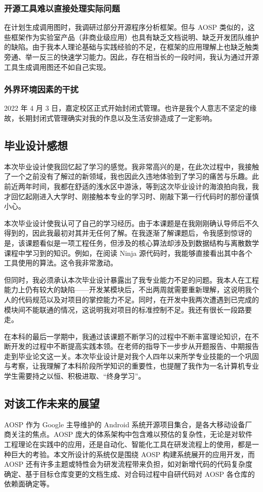 \subsubsection{开源工具难以直接处理实际问题}

在计划生成调用图时，我调研过部分开源程序分析框架。但与 AOSP 类似的，这些框架作为实验室产品（非商业级应用）也具有缺乏文档说明、缺乏开发团队维护的缺陷。由于我本人理论基础与实践经验的不足，在框架的应用理解上也缺乏触类旁通、举一反三的快速学习能力。因此，存在相当长的一段时间，我认为通过开源工具生成调用图还不如自己实现。

\subsubsection{外界环境因素的干扰}

2022 年 4 月 3 日，嘉定校区正式开始封闭式管理。也许是我个人意志不坚定的缘故，长期封闭式管理确实对我的作息以及生活安排造成了一定影响。

\subsection{毕业设计感想}

本次毕业设计使我回忆起了学习的感觉。我非常高兴的是，在此次过程中，我接触了一个之前没有了解过的新领域，我也因此久违地体验到了学习的痛苦与乐趣。此前近两年时间，我都在舒适的浅水区中游泳，等到这次毕业设计的海浪拍向我，我才回忆起刚进入大学时、刚接触本专业的学习时、刚敲下第一行代码时的那份谨慎小心。

本次毕业设计使我认可了自己的学习经历。由于本课题是在我刚刚确认导师后不久得到的，因此我最初对其并无任何了解。在我逐渐了解课题后，令我感到惊讶的是，该课题看似是一项工程任务，但涉及的核心算法却涉及到数据结构与离散数学课程中学习到的知识。例如，在阅读 Ninja 源代码时，我能够直接看出其中各个工具使用的算法。这令我非常激动。

但同时，我必须承认本次毕业设计暴露出了我专业能力不足的问题。我本人在工程能力上仍有较大的缺陷——开发某模块后，不出两周就需要重新理解，这说明我个人的代码规范以及对项目的掌控能力不足。同时，在开发中我两次遭遇到已完成的模块间不能联通的情况，这说明我对项目的标准控制不足。我还有很长一段路要走。

在本科的最后一学期中，我通过该课题不断学习的过程中不断丰富理论知识，在不断开发的过程中不断提高实践本领。在老师的指导下一步步从开题报告、中期报告走到毕业论文这一关。本次毕业设计是对我个人四年以来所学专业技能的一个巩固与考察，让我理解了本科阶段所学知识的重要性，也提醒了我作为一名计算机专业学生需要持之以恒、积极进取、“终身学习”。

\subsection{对该工作未来的展望}

AOSP 作为 Google 主导维护的 Android 系统开源项目集合，是各大移动设备厂商关注的焦点。AOSP 庞大的体系架构中包含难以预估的复杂性，无论是对软件工程理论在实践中的应用，还是自动化、智能化工具在研发流程上的使用，都是一种巨大的考验。本文所设计的系统仅是围绕 AOSP 构建系统展开的应用开发，而 AOSP 还有许多主题或特性会为研发流程带来负担，如对新增代码的代码复杂度确定、基于目标仓库变更的文档生成、对合码过程中自研代码对 AOSP 各仓库的依赖面确定等。
